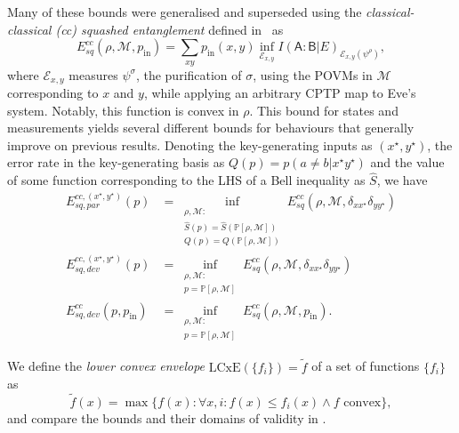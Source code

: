 \documentclass[10pt, a4paper]{article}
\numberwithin{equation}{section} %
\theoremstyle{definition}
\theoremstyle{plain}
\newcommand{\?}{\mathrel{?}} %
\newcommand{\sM}{\mathcal{M}}
\newcommand{\cE}{\mathcal{E}}
\newcommand{\crv}[1]{\mathsf{#1}}
\newcommand{\LCxE}[1]{\mathrm{LCxE}\left(#1\right)}
\newcommand{\prin}[1][p]{#1_{\mathrm{in}}}
\newcommand{\behav}[2]{\mathbb{P}\left[#1, #2\right]}
\begin{document}
    Many of these bounds were generalised and superseded using the \emph{classical-classical (cc) squashed entanglement} defined in~\cite{CCSquashedEntangle} as
    \begin{equation}
      E^{cc}_{sq}(\rho, \sM, \prin) = \sum_{xy} \prin(x,y) \inf_{\cE_{x,y}} I{(\crv{A} : \crv{B}|E)}_{\cE_{x,y}(\psi^{\rho})},
    \end{equation}
    where \(\cE_{x,y}\) measures \(\psi^\sigma\), the purification of \({\sigma}\), using the POVMs in \(\sM\) corresponding to \(x\) and \(y\), while applying an arbitrary CPTP map to Eve's system. Notably, this function is convex in \(\rho\). This bound for states and measurements yields several different bounds for behaviours that generally improve on previous results. Denoting the key-generating inputs as \((x^{\star},y^{\star})\), the error rate in the key-generating basis as \(Q(p) = p(a\neq{b}|x^{\star}y^{\star})\) and the value of some function corresponding to the LHS of a Bell inequality as \(\hat{S}\), we have
    \begin{align}
    E^{cc,(x^{\star},y^{\star})}_{sq,par}(p) &= \inf_{\substack{\rho, \sM : \\ \hat{S}(p) = \hat{S}(\behav{\rho}{ \sM}) \\ Q(p) = Q(\behav{\rho}{ \sM}) }} E^{cc}_{sq}(\rho, \sM, \delta_{xx^{\star}}\delta_{yy^{\star}}) \\
  E^{cc,(x^{\star},y^{\star})}_{sq,dev}(p) &= \inf_{\substack{\rho, \sM : \\ p = \behav{\rho}{ \sM}}} E^{cc}_{sq}(\rho, \sM, \delta_{xx^{\star}}\delta_{yy^{\star}}) \\
E^{cc}_{sq,dev}(p,\prin) &= \inf_{\substack{\rho, \sM : \\ p = \behav{\rho}{ \sM}}} E^{cc}_{sq}(\rho, \sM, \prin).
    \end{align}

    We define the \emph{lower convex envelope} \(\LCxE{\{f_i\}} = \tilde{f}\) of a set of functions \(\{f_i\}\) as
    \begin{equation}\label{eqn:LCxEdef}
      \tilde{f}(x) = \max\{ f(x) : \forall x, i : f(x) \leq f_i(x) \land f\text{ convex} \},
    \end{equation}
    and compare the bounds and their domains of validity in .
\end{document}
